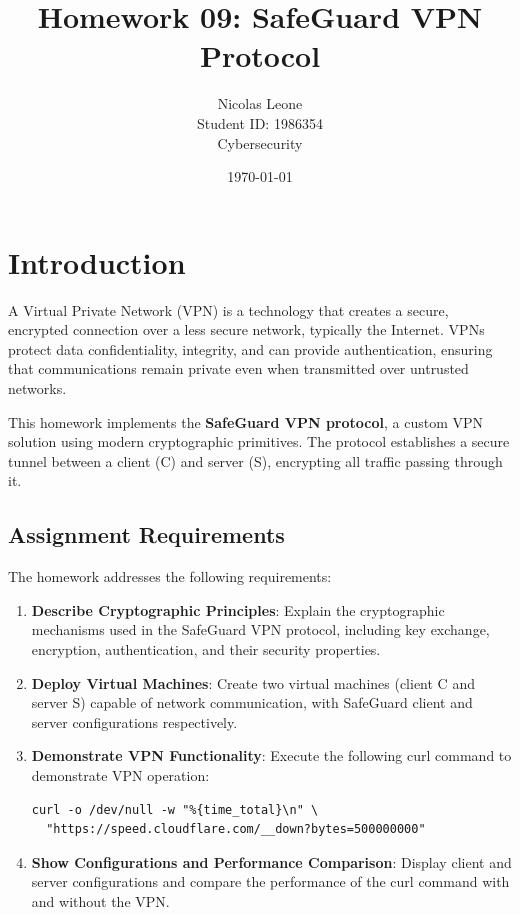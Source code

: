 \documentclass[12pt,a4paper]{article}
\title{Homework 09: SafeGuard VPN Protocol}
\author{Nicolas Leone\\Student ID: 1986354\\Cybersecurity}
\date{\today}
\begin{document}
\maketitle

\tableofcontents
\clearpage

\section{Introduction}

A Virtual Private Network (VPN) is a technology that creates a secure, encrypted connection over a less secure network, typically the Internet. VPNs protect data confidentiality, integrity, and can provide authentication, ensuring that communications remain private even when transmitted over untrusted networks.

This homework implements the \textbf{SafeGuard VPN protocol}, a custom VPN solution using modern cryptographic primitives. The protocol establishes a secure tunnel between a client (C) and server (S), encrypting all traffic passing through it.

\subsection{Assignment Requirements}

The homework addresses the following requirements:

\begin{enumerate}
    \item \textbf{Describe Cryptographic Principles}: Explain the cryptographic mechanisms used in the SafeGuard VPN protocol, including key exchange, encryption, authentication, and their security properties.
    
    \item \textbf{Deploy Virtual Machines}: Create two virtual machines (client C and server S) capable of network communication, with SafeGuard client and server configurations respectively.
    
    \item \textbf{Demonstrate VPN Functionality}: Execute the following curl command to demonstrate VPN operation:
    \begin{verbatim}
curl -o /dev/null -w "%{time_total}\n" \
  "https://speed.cloudflare.com/__down?bytes=500000000"
    \end{verbatim}
    
    \item \textbf{Show Configurations and Performance Comparison}: Display client and server configurations and compare the performance of the curl command with and without the VPN.
\end{enumerate}
\end{document}
